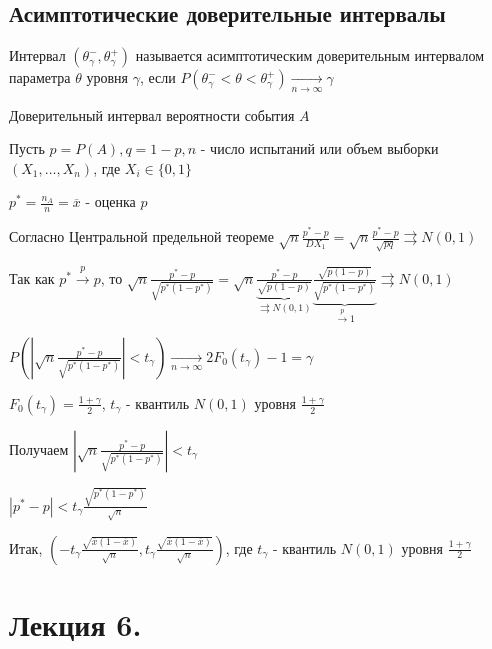 \documentclass[12pt]{article}
\begin{document}
\subsection{Асимптотические доверительные интервалы}

\Def Интервал $(\theta^-_\gamma, \theta^+_\gamma)$ называется асимптотическим доверительным интервалом параметра $\theta$ 
уровня $\gamma$, если $P(\theta^-_\gamma < \theta < \theta^+_\gamma) \underset{n \to \infty}{\longrightarrow} \gamma$

\Ex Доверительный интервал вероятности события $A$

Пусть $p = P(A), q = 1 - p, n$ - число испытаний или объем выборки $(X_1, \dots, X_n)$, где $X_i \in \{0, 1\}$

$p^* = \frac{n_A}{n} = \overline{x}$ - оценка $p$

Согласно Центральной предельной теореме $\sqrt{n} \frac{p^* - p}{D X_1} = \sqrt{n} \frac{p^* - p}{\sqrt{pq}} \rightrightarrows N(0, 1)$

Так как $p^* \overset{p}{\longrightarrow} p$, то $\sqrt{n} \frac{p^* - p}{\sqrt{p^* (1 - p^*)}} = 
\sqrt{n} \underset{\rightrightarrows N(0, 1)}{\underbrace{\frac{p^* - p}{\sqrt{p (1 - p)}}}} \underset{\overset{p}{\longrightarrow} 1}{\underbrace{\frac{\sqrt{p (1 - p)}}{\sqrt{p^* (1 - p^*)}}}} \rightrightarrows N(0, 1)$


$P\left(\left|\sqrt{n} \frac{p^* - p}{\sqrt{p^* (1 - p^*)}}\right| < t_\gamma\right) \underset{n \to \infty}{\longrightarrow} 2F_0(t_\gamma) - 1 = \gamma$

$F_0(t_\gamma) = \frac{1 + \gamma}{2}$, $t_\gamma$ - квантиль $N(0, 1)$ уровня $\frac{1 + \gamma}{2}$

Получаем $\left|\sqrt{n} \frac{p^* - p}{\sqrt{p^* (1 - p^*)}}\right| < t_\gamma$

$|p^* - p| < t_\gamma \frac{\sqrt{p^* (1 - p^*)}}{\sqrt{n}}$

Итак, $\left(-t_\gamma \frac{\sqrt{\overline{x} (1 - \overline{x})}}{\sqrt{n}}, t_\gamma \frac{\sqrt{\overline{x} (1 - \overline{x})}}{\sqrt{n}}\right)$, где $t_\gamma$ - квантиль $N(0, 1)$ уровня $\frac{1 + \gamma}{2}$










\section{Лекция 6.}
\end{document}
